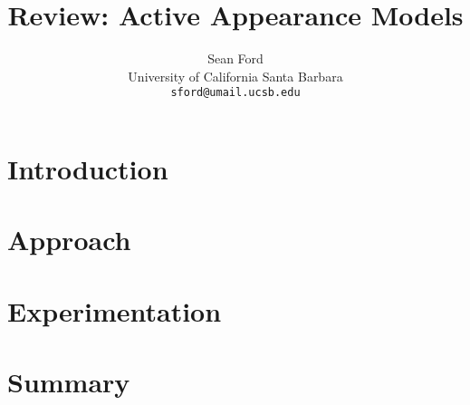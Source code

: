 \documentclass[10pt,twocolumn,letterpaper]{article}
\begin{document}
\title{Review: Active Appearance Models}

\author{Sean Ford\\
University of California Santa Barbara\\
{\tt\small sford@umail.ucsb.edu}
}

\maketitle
\thispagestyle{empty}

\begin{abstract}
\end{abstract}


\section{Introduction}


\section{Approach}

\section{Experimentation}

\section{Summary}
\end{document}
